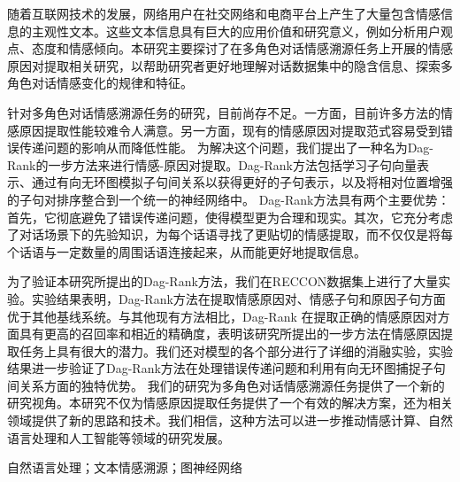 
\clearpage
\titlespacing{\chapter}{0pt}{0mm}{5mm}





随着互联网技术的发展，网络用户在社交网络和电商平台上产生了大量包含情感信息的主观性文本。这些文本信息具有巨大的应用价值和研究意义，例如分析用户观点、态度和情感倾向。本研究主要探讨了在多角色对话情感溯源任务上开展的情感原因对提取相关研究，以帮助研究者更好地理解对话数据集中的隐含信息、探索多角色对话情感变化的规律和特征。

针对多角色对话情感溯源任务的研究，目前尚存不足。一方面，目前许多方法的情感原因提取性能较难令人满意。另一方面，现有的情感原因对提取范式容易受到错误传递问题的影响从而降低性能。
为解决这个问题，我们提出了一种名为Dag-Rank的一步方法来进行情感-原因对提取。Dag-Rank方法包括学习子句向量表示、通过有向无环图模拟子句间关系以获得更好的子句表示，以及将相对位置增强的子句对排序整合到一个统一的神经网络中。
Dag-Rank方法具有两个主要优势：首先，它彻底避免了错误传递问题，使得模型更为合理和现实。其次，它充分考虑了对话场景下的先验知识，为每个话语寻找了更贴切的情感提取，而不仅仅是将每个话语与一定数量的周围话语连接起来，从而能更好地提取信息。

为了验证本研究所提出的Dag-Rank方法，我们在RECCON数据集上进行了大量实验。实验结果表明，Dag-Rank方法在提取情感原因对、情感子句和原因子句方面优于其他基线系统。与其他现有方法相比，Dag-Rank 在提取正确的情感原因对方面具有更高的召回率和相近的精确度，表明该研究所提出的一步方法在情感原因提取任务上具有很大的潜力。我们还对模型的各个部分进行了详细的消融实验，实验结果进一步验证了Dag-Rank方法在处理错误传递问题和利用有向无环图捕捉子句间关系方面的独特优势。
我们的研究为多角色对话情感溯源任务提供了一个新的研究视角。本研究不仅为情感原因提取任务提供了一个有效的解决方案，还为相关领域提供了新的思路和技术。我们相信，这种方法可以进一步推动情感计算、自然语言处理和人工智能等领域的研究发展。

\vspace{\baselineskip}
 自然语言处理；文本情感溯源；图神经网络


